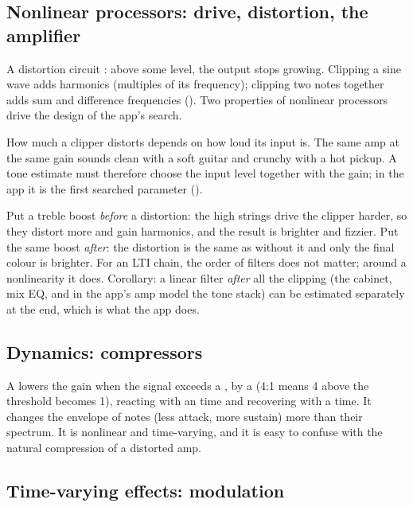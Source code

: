 \subsection{Nonlinear processors: drive, distortion, the amplifier}

A distortion circuit : above some level, the output stops growing.
Clipping a sine wave adds harmonics (multiples of its frequency); clipping two
notes together adds sum and difference frequencies ().
Two properties of nonlinear processors drive the design of the app's search.

\begin{keyidea}
How much a clipper distorts depends on how loud its input is. The same amp at
the same gain sounds clean with a soft guitar and crunchy with a hot pickup. A
tone estimate must therefore choose the input level together with the gain; in
the app it is the first searched parameter ().
\end{keyidea}

\begin{worked}
Put a treble boost \emph{before} a distortion: the high strings drive the
clipper harder, so they distort more and gain harmonics, and the result is
brighter and fizzier. Put the same boost \emph{after}: the distortion is the
same as without it and only the final colour is brighter. For an LTI chain, the
order of filters does not matter; around a nonlinearity it does. Corollary: a
linear filter \emph{after} all the clipping (the cabinet, mix EQ, and in the
app's amp model the tone stack) can be estimated separately at the end, which is
what the app does.
\end{worked}

\subsection{Dynamics: compressors}

A  lowers the gain when the signal exceeds a
, by a  (4:1 means 4\dB{} above the threshold
becomes 1\dB), reacting with an  time and recovering with a
 time. It changes the envelope of notes (less attack, more
sustain) more than their spectrum. It is nonlinear and time-varying, and it is
easy to confuse with the natural compression of a distorted amp.

\subsection{Time-varying effects: modulation}

